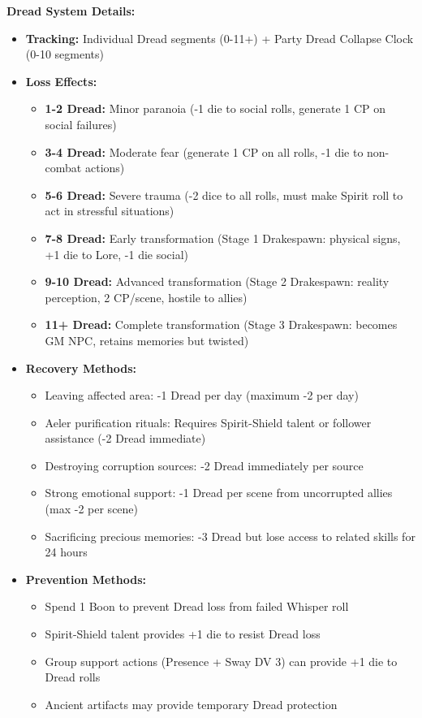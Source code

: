 \documentclass[11pt]{article}
\begin{document}
\textbf{Dread System Details:}
\begin{itemize}
\item \textbf{Tracking:} Individual Dread segments (0-11+) + Party Dread Collapse Clock (0-10 segments)
\item \textbf{Loss Effects:}
  \begin{itemize}
  \item \textbf{1-2 Dread:} Minor paranoia (-1 die to social rolls, generate 1 CP on social failures)
  \item \textbf{3-4 Dread:} Moderate fear (generate 1 CP on all rolls, -1 die to non-combat actions)
  \item \textbf{5-6 Dread:} Severe trauma (-2 dice to all rolls, must make Spirit roll to act in stressful situations)
  \item \textbf{7-8 Dread:} Early transformation (Stage 1 Drakespawn: physical signs, +1 die to Lore, -1 die social)
  \item \textbf{9-10 Dread:} Advanced transformation (Stage 2 Drakespawn: reality perception, 2 CP/scene, hostile to allies)
  \item \textbf{11+ Dread:} Complete transformation (Stage 3 Drakespawn: becomes GM NPC, retains memories but twisted)
  \end{itemize}
\item \textbf{Recovery Methods:}
  \begin{itemize}
  \item Leaving affected area: -1 Dread per day (maximum -2 per day)
  \item Aeler purification rituals: Requires Spirit-Shield talent or follower assistance (-2 Dread immediate)
  \item Destroying corruption sources: -2 Dread immediately per source
  \item Strong emotional support: -1 Dread per scene from uncorrupted allies (max -2 per scene)
  \item Sacrificing precious memories: -3 Dread but lose access to related skills for 24 hours
  \end{itemize}
\item \textbf{Prevention Methods:}
  \begin{itemize}
  \item Spend 1 Boon to prevent Dread loss from failed Whisper roll
  \item Spirit-Shield talent provides +1 die to resist Dread loss
  \item Group support actions (Presence + Sway DV 3) can provide +1 die to Dread rolls
  \item Ancient artifacts may provide temporary Dread protection
  \end{itemize}
\end{itemize}
\end{document}
